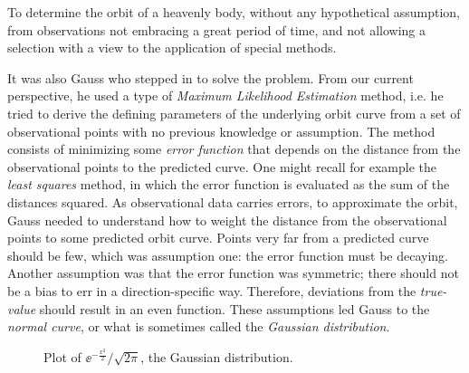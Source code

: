 \begin{citacao}
	To determine the orbit of a heavenly body, without any hypothetical assumption,
	from observations not embracing a great period of time, and not allowing a selection
	with a view to the application of special methods. \cite{gauss1809theoria}
\end{citacao}

It was also Gauss who stepped in to solve the problem. From our current perspective, he used a type of \textit{Maximum Likelihood Estimation} method, i.e. he tried to derive the defining parameters of the underlying orbit curve from a set of observational points with no previous knowledge or assumption. The method consists of minimizing some \textit{error function} that depends on the distance from the observational points to the predicted curve. One might recall for example the \textit{least squares} method, in which the error function is evaluated as the sum of the distances squared. As observational data carries errors, to approximate the orbit, Gauss needed to understand how to weight the distance from the observational points to some predicted orbit curve. Points very far from a predicted curve should be few, which was assumption one: the error function must be decaying. Another assumption was that the error function was symmetric; there should not be a bias to err in a direction-specific way. Therefore, deviations from the \textit{true-value} should result in an even function. These assumptions led Gauss to the \textit{normal curve}, or what is sometimes called the \textit{Gaussian distribution}. 

\begin{figure}[h!]
	\centering
	\caption{Plot of $\ee^{-\frac{x^2}{2}} / \sqrt{2\pi}$, the 
	Gaussian distribution.}
	\label{Figure: Gaussian}
\end{figure}

